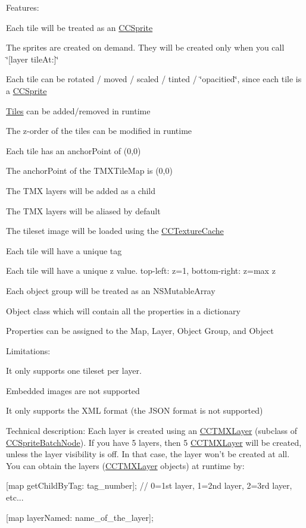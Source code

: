 Features\-:
\begin{DoxyItemize}
\item Each tile will be treated as an \hyperlink{class_c_c_sprite}{C\-C\-Sprite}
\item The sprites are created on demand. They will be created only when you call \char`\"{}\mbox{[}layer tile\-At\-:\mbox{]}\char`\"{}
\item Each tile can be rotated / moved / scaled / tinted / \char`\"{}opacitied\char`\"{}, since each tile is a \hyperlink{class_c_c_sprite}{C\-C\-Sprite}
\item \hyperlink{class_tiles}{Tiles} can be added/removed in runtime
\item The z-\/order of the tiles can be modified in runtime
\item Each tile has an anchor\-Point of (0,0)
\item The anchor\-Point of the T\-M\-X\-Tile\-Map is (0,0)
\item The T\-M\-X layers will be added as a child
\item The T\-M\-X layers will be aliased by default
\item The tileset image will be loaded using the \hyperlink{interface_c_c_texture_cache}{C\-C\-Texture\-Cache}
\item Each tile will have a unique tag
\item Each tile will have a unique z value. top-\/left\-: z=1, bottom-\/right\-: z=max z
\item Each object group will be treated as an N\-S\-Mutable\-Array
\item Object class which will contain all the properties in a dictionary
\item Properties can be assigned to the Map, Layer, Object Group, and Object
\end{DoxyItemize}

Limitations\-:
\begin{DoxyItemize}
\item It only supports one tileset per layer.
\item Embedded images are not supported
\item It only supports the X\-M\-L format (the J\-S\-O\-N format is not supported)
\end{DoxyItemize}

Technical description\-: Each layer is created using an \hyperlink{interface_c_c_t_m_x_layer}{C\-C\-T\-M\-X\-Layer} (subclass of \hyperlink{interface_c_c_sprite_batch_node}{C\-C\-Sprite\-Batch\-Node}). If you have 5 layers, then 5 \hyperlink{interface_c_c_t_m_x_layer}{C\-C\-T\-M\-X\-Layer} will be created, unless the layer visibility is off. In that case, the layer won't be created at all. You can obtain the layers (\hyperlink{interface_c_c_t_m_x_layer}{C\-C\-T\-M\-X\-Layer} objects) at runtime by\-:
\begin{DoxyItemize}
\item \mbox{[}map get\-Child\-By\-Tag\-: tag\-\_\-number\mbox{]}; // 0=1st layer, 1=2nd layer, 2=3rd layer, etc...
\item \mbox{[}map layer\-Named\-: name\-\_\-of\-\_\-the\-\_\-layer\mbox{]};
\end{DoxyItemize}

